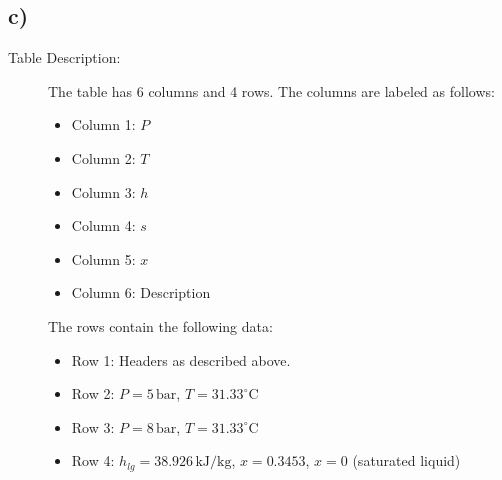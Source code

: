 

\subsection*{c)}

\begin{description}
    \item[Table Description:] The table has 6 columns and 4 rows. The columns are labeled as follows: 
    \begin{itemize}
        \item Column 1: \( P \)
        \item Column 2: \( T \)
        \item Column 3: \( h \)
        \item Column 4: \( s \)
        \item Column 5: \( x \)
        \item Column 6: Description
    \end{itemize}
    The rows contain the following data:
    \begin{itemize}
        \item Row 1: Headers as described above.
        \item Row 2: \( P = 5 \, \text{bar} \), \( T = 31.33^\circ \text{C} \)
        \item Row 3: \( P = 8 \, \text{bar} \), \( T = 31.33^\circ \text{C} \)
        \item Row 4: \( h_{lg} = 38.926 \, \text{kJ/kg} \), \( x = 0.3453 \), \( x = 0 \) (saturated liquid)
    \end{itemize}
\end{description}